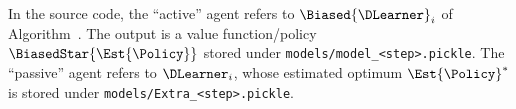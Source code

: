 In the source code, the ``active'' agent refers to $\Biased{\DLearner}_i$ of Algorithm~.
The output is a value function/policy $\BiasedStar{\Est{\Policy}}$ stored under \texttt{models/model\_<step>.pickle}.
The ``passive'' agent refers to $\DLearner_i$, whose estimated optimum $\Est{\Policy}^*$ is stored under \texttt{models/Extra\_<step>.pickle}.

